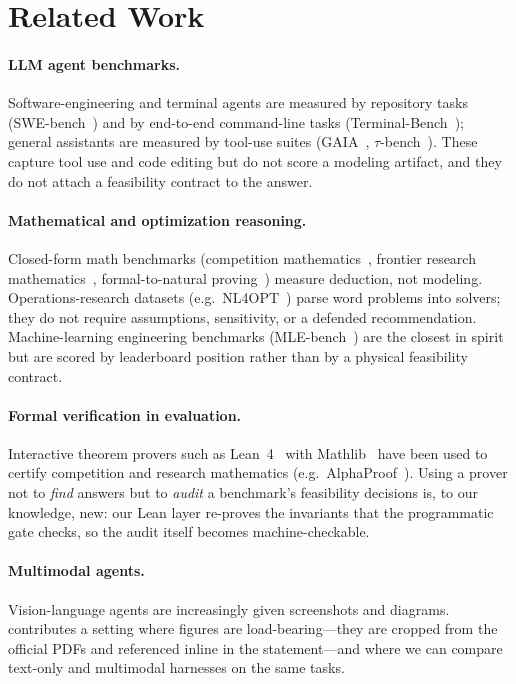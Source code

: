 \section{Related Work}


\paragraph{LLM agent benchmarks.}
Software-engineering and terminal agents are measured by repository tasks (SWE-bench~\cite{TODO-swebench}) and by end-to-end command-line tasks (Terminal-Bench~\cite{TODO-terminalbench}); general assistants are measured by tool-use suites (GAIA~\cite{TODO-gaia}, $\tau$-bench~\cite{TODO-taubench}). These capture tool use and code editing but do not score a modeling artifact, and they do not attach a feasibility contract to the answer.

\paragraph{Mathematical and optimization reasoning.}
Closed-form math benchmarks (competition mathematics~\cite{TODO-math}, frontier research mathematics~\cite{TODO-frontiermath}, formal-to-natural proving~\cite{TODO-minif2f}) measure deduction, not modeling. Operations-research datasets (e.g.\ NL4OPT~\cite{TODO-nl4opt}) parse word problems into solvers; they do not require assumptions, sensitivity, or a defended recommendation. Machine-learning engineering benchmarks (MLE-bench~\cite{TODO-mlebench}) are the closest in spirit but are scored by leaderboard position rather than by a physical feasibility contract.

\paragraph{Formal verification in evaluation.}
Interactive theorem provers such as Lean~4~\cite{TODO-lean4} with Mathlib~\cite{TODO-mathlib} have been used to certify competition and research mathematics (e.g.\ AlphaProof~\cite{TODO-alphaproof}). Using a prover not to \emph{find} answers but to \emph{audit} a benchmark's feasibility decisions is, to our knowledge, new: our Lean layer re-proves the invariants that the programmatic gate checks, so the audit itself becomes machine-checkable.

\paragraph{Multimodal agents.}
Vision-language agents are increasingly given screenshots and diagrams. \bench{} contributes a setting where figures are load-bearing---they are cropped from the official PDFs and referenced inline in the statement---and where we can compare text-only and multimodal harnesses on the same tasks.

